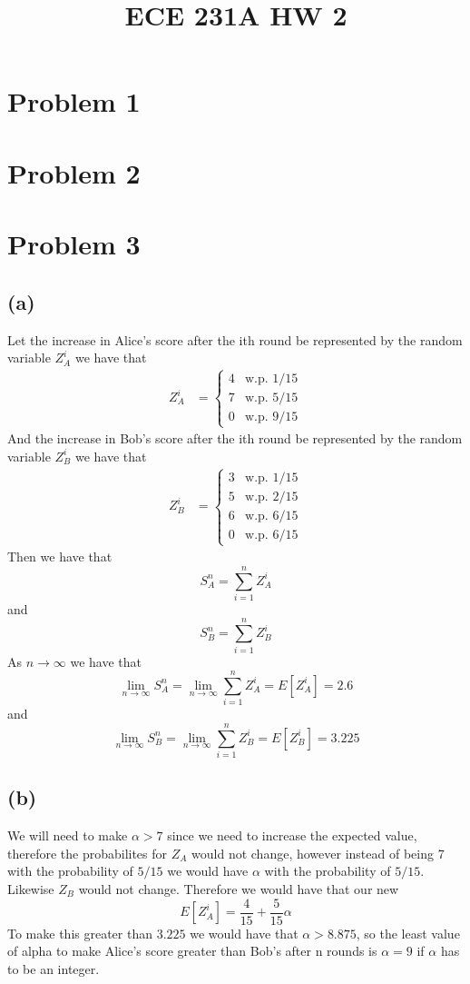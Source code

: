 
\title{ECE 231A HW 2}

\maketitle
\section*{Problem 1}
\section*{Problem 2}
\section*{Problem 3}
\subsection*{(a)}
Let the increase in Alice's score after the ith round be 
represented by the random variable $Z_A^i$ we have that
\begin{align*}
    Z_A^i&=\begin{cases}
        4 & \text{w.p. } 1/15\\
        7 & \text{w.p. } 5/15\\
        0 & \text{w.p. } 9/15
    \end{cases}
\end{align*}
And the increase in Bob's score after the ith round be
represented by the random variable $Z_B^i$ we have that
\begin{align*}
    Z_B^i&=\begin{cases}
        3 & \text{w.p. } 1/15\\
        5 & \text{w.p. } 2/15\\
        6 & \text{w.p. } 6/15\\
        0 & \text{w.p. } 6/15
    \end{cases}
\end{align*}
Then we have that 
$$S_A^n=\sum_{i=1}^n Z_A^i$$
and
$$S_B^n=\sum_{i=1}^n Z_B^i$$
As $n\to\infty$ we have that
$$\lim_{n\to\infty}S_A^n=\lim_{n\to\infty}\sum_{i=1}^n Z_A^i=E[Z_A^i]=\boxed{2.6}$$
and
$$\lim_{n\to\infty}S_B^n=\lim_{n\to\infty}\sum_{i=1}^n Z_B^i=E[Z_B^i]=\boxed{3.225}$$
\subsection*{(b)}
We will need to make $\alpha>7$ since we need to increase the expected value,
therefore the probabilites for $Z_A$ would not change, however instead 
of being 7 with the probability of $5/15$ we would have $\alpha$ with the
probability of $5/15$. Likewise $Z_B$ would not change. Therefore we would have that
our new 
$$E[Z_A^i]=\frac{4}{15}+\frac{5}{15}\alpha$$
To make this greater than $3.225$ we would have that
$\alpha>8.875$, so the least value of alpha to make Alice's
score greater than Bob's after n rounds is $\boxed{\alpha=9}$ if $\alpha$ has
to be an integer. 

